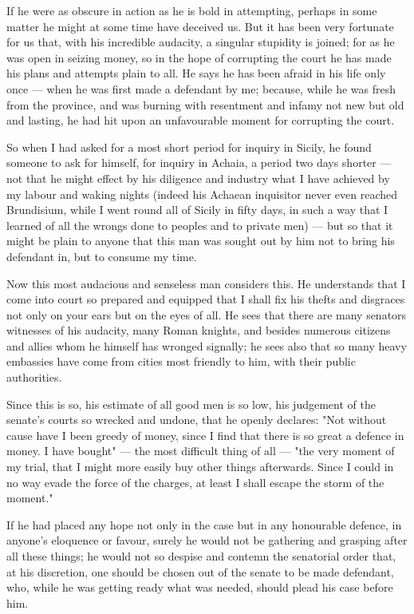  If he were as obscure in action as he is bold in attempting, perhaps in some matter he might at some time have deceived us. But it has been very fortunate for us that, with his incredible audacity, a singular stupidity is joined; for as he was open in seizing money, so in the hope of corrupting the court he has made his plans and attempts plain to all. He says he has been afraid in his life only once --- when he was first made a defendant by me; because, while he was fresh from the province, and was burning with resentment and infamy not new but old and lasting, he had hit upon an unfavourable moment for corrupting the court.

 So when I had asked for a most short period for inquiry in Sicily, he found someone to ask for himself, for inquiry in Achaia, a period two days shorter --- not that he might effect by his diligence and industry what I have achieved by my labour and waking nights (indeed his Achaean inquisitor never even reached Brundisium, while I went round all of Sicily in fifty days, in such a way that I learned of all the wrongs done to peoples and to private men) --- but so that it might be plain to anyone that this man was sought out by him not to bring his defendant in, but to consume my time.

 Now this most audacious and senseless man considers this. He understands that I come into court so prepared and equipped that I shall fix his thefts and disgraces not only on your ears but on the eyes of all. He sees that there are many senators witnesses of his audacity, many Roman knights, and besides numerous citizens and allies whom he himself has wronged signally; he sees also that so many heavy embassies have come from cities most friendly to him, with their public authorities.

 Since this is so, his estimate of all good men is so low, his judgement of the senate's courts so wrecked and undone, that he openly declares: "Not without cause have I been greedy of money, since I find that there is so great a defence in money. I have bought" --- the most difficult thing of all --- "the very moment of my trial, that I might more easily buy other things afterwards. Since I could in no way evade the force of the charges, at least I shall escape the storm of the moment."

 If he had placed any hope not only in the case but in any honourable defence, in anyone's eloquence or favour, surely he would not be gathering and grasping after all these things; he would not so despise and contemn the senatorial order that, at his discretion, one should be chosen out of the senate to be made defendant, who, while he was getting ready what was needed, should plead his case before him.

